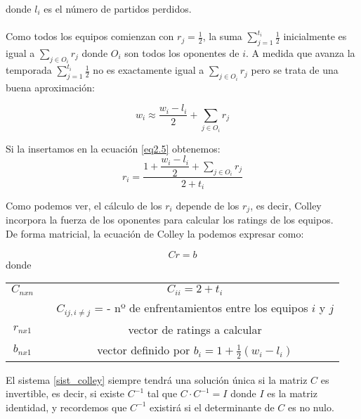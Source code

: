 donde $l_{i}$ es el número de partidos perdidos.\\
\\
Como todos los equipos comienzan con $r_{j} = \frac{1}{2}$, la suma $\sum\limits_{j=1}^{t_{i}} \frac{1}{2} $ inicialmente es igual a $\sum\limits_{j \in O_{i}} r_{j} $ donde $O_{i}$ son todos los oponentes de $i$.
A medida que avanza la temporada $\sum\limits_{j=1}^{t_{i}} \frac{1}{2} $ no es exactamente igual a $\sum\limits_{j \in O_{i}} r_{j} $ pero se trata de una buena aproximación:
\begin{center}
	\begin{equation}
		w_{i} \approx \dfrac{w_{i}-l_{i}}{2} + \sum\limits_{j \in O_{i}} r_{j}
	\end{equation}
\end{center}

Si la insertamos en la ecuación \ref{eq2.5} obtenemos:
\begin{equation}
	r_{i} = \dfrac{1+\dfrac{w_{i}-l_{i}}{2} + \sum\limits_{j \in O_{i}} r_{j}}{2+t_{i}}
\end{equation}

Como podemos ver, el cálculo de los $r_{i}$ depende de los $r_{j}$, es decir, Colley incorpora la fuerza de los oponentes para calcular los ratings de los equipos.\\

De forma matricial, la ecuación de Colley la podemos expresar como:

\begin{equation} \label{sist_colley}
	Cr = b 
\end{equation}
donde
\begin{center}
	\begin{tabular}{ccc}
		\hline $C_{nxn}$ & & $C_{ii} = 2 + t_{i}$  \\
		& & $C_{ij, i \neq j}$ = - nº de enfrentamientos entre los equipos $i$ y $j$\\ 
		\hline  $r_{nx1}$ & & vector de ratings a calcular \\ 
		\hline  $b_{nx1}$ & & vector definido por $b_{i}=1+\frac{1}{2}(w_{i}-l_{i})$\\ 
		\hline 
	\end{tabular}
\end{center} 

El sistema \ref{sist_colley} siempre tendrá una solución única si la matriz $C$ es invertible, es decir, si existe $C^{-1}$ tal que $C\cdotp C^{-1} = I$ donde $I$ es la matriz identidad, y recordemos que $C^{-1}$ existirá si el determinante de $C$ es no nulo.

